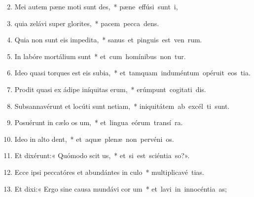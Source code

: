 \begin{flushleft}
\begin{enumerate}[leftmargin=*]
\setcounter{enumi}{1}

\item Mei autem pæne moti sunt des,~* \mbox{pæne effúsi sunt  i,}

\item quia zelávi super glorites,~* \mbox{pacem pecca dens.}

\item Quia non sunt eis impedita,~* \mbox{sanus et pinguis est ven rum.}

\item In labóre mortálium  sunt~* \mbox{et cum homínibus non tur.}

\item Ideo quasi torques est eis subia,~* \mbox{et tamquam induméntum opéruit eos tia.}

\item Prodit quasi ex ádipe iníquitas erum,~* \mbox{erúmpunt cogitati dis.}

\item Subsannavérunt et locúti sunt netiam,~* \mbox{iniquitátem ab excél ti sunt.}

\item Posuérunt in cælo os um,~* \mbox{et lingua eórum transí  ra.}

\item Ideo in alto dent,~* \mbox{et aquæ plenæ non pervéni  os.}

\item Et dixérunt:« Quómodo scit us,~* \mbox{et si est sciéntia  so?».}

\item Ecce ipsi peccatóres et abundántes in culo~* \mbox{multiplicavé tias.}

\item Et dixi:« Ergo sine causa mundávi cor um~* \mbox{et lavi in innocéntia  as;}


\end{enumerate}
\end{flushleft}
